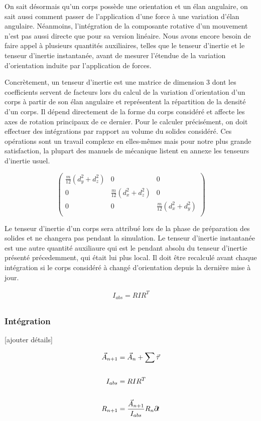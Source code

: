 On sait désormais qu'un corps possède une orientation et un élan
angulaire, on sait aussi comment passer de l'application d'une force à
une variation d'élan angulaire. Néanmoins, l'intégration de la
composante rotative d'un mouvement n'est pas aussi directe que pour sa
version linéaire. Nous avons encore besoin de faire appel à plusieurs
quantités auxiliaires, telles que le tenseur d'inertie et le tenseur
d'inertie instantanée, avant de mesurer l'étendue de la variation
d'orientation induite par l'application de forces.

Concrètement, un tenseur d'inertie est une matrice de dimension 3 dont
les coefficients servent de facteurs lors du calcul de la variation
d'orientation d'un corps à partir de son élan angulaire et
représentent la répartition de la densité d'un corps. Il dépend
directement de la forme du corps considéré et affecte les axes de
rotation principaux de ce dernier. Pour le calculer précisément, on
doit effectuer des intégrations par rapport au volume du solides
considéré. Ces opérations sont un travail complexe en elles-mêmes mais
pour notre plus grande satisfaction, la plupart des manuels de
mécanique listent en annexe les tenseurs d'inertie usuel. 

\[
\begin{pmatrix}
  \frac{m}{12}(d_y^2 + d_z^2) & 0 & 0 \\
  0 & \frac{m}{12}(d_x^2 + d_z^2) & 0 \\
  0 & 0 & \frac{m}{12}(d_x^2 + d_y^2) \\
\end{pmatrix}
\]

Le tenseur d'inertie d'un corps sera attribué lors de la phase de
préparation des solides et ne changera pas pendant la simulation. Le
tenseur d'inertie instantanée est une autre quantité auxiliaure qui
est le pendant absolu du tenseur d'inertie présenté précedemment, qui
était lui plus local. Il doit être recalculé avant chaque intégration
si le corps considéré à changé d'orientation depuis la dernière mise à
jour.

\begin{align*}
  I_{abs} = R I R^T \\
\end{align*}

\subsubsection{Intégration}

[ajouter détails]

\begin{align*}
  \vec{A}_{n+1} &= \vec{A}_n + \sum \vec{\tau} \\ \\
  I_{abs} &= R I R^T \\ \\
  R_{n+1} &= \frac{\vec{A}_{n+1}}{I_{abs}} R_n \partial \! t \\
\end{align*}
